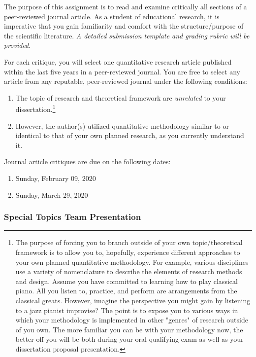 \documentclass[
]{article}
\providecommand{\tightlist}{%
  \setlength{\itemsep}{0pt}\setlength{\parskip}{0pt}}
\begin{document}
The purpose of this assignment is to read and examine critically all
sections of a peer-reviewed journal article. As a student of educational
research, it is imperative that you gain familiarity and comfort with
the structure/purpose of the scientific literature. \emph{A detailed
submission template and grading rubric will be provided}.

For each critique, you will select one quantitative research article
published within the last five years in a peer-reviewed journal. You are
free to select any article from any reputable, peer-reviewed journal
under the following conditions:

\begin{enumerate}
\def\labelenumi{\arabic{enumi}.}
\tightlist
\item
  The topic of research and theoretical framework are \emph{unrelated}
  to your
  dissertation.\footnote{The purpose of forcing you to branch outside of your own topic/theoretical framework is to allow you to, hopefully, experience different approaches to your own planned quantitative methodology. For example, various disciplines use a variety of nomenclature to describe the elements of research methods and design. Assume you have committed to learning how to play classical piano. All you listen to, practice, and perform are arrangements from the classical greats. However, imagine the perspective you might gain by listening to a jazz pianist improvise? The point is to expose you to various ways in which your methodology is implemented in other "genres" of research outside of you own. The more familiar you can be with your methodology now, the better off you will be both during your oral qualifying exam as well as your dissertation proposal presentation.}
\item
  However, the author(s) utilized quantitative methodology similar to or
  identical to that of your own planned research, as you currently
  understand it.
\end{enumerate}

Journal article critiques are due on the following dates:

\begin{enumerate}
\def\labelenumi{\arabic{enumi}.}
\tightlist
\item
  Sunday, February 09, 2020
\item
  Sunday, March 29, 2020
\end{enumerate}

\subsubsection{Special Topics Team Presentation}
\end{document}
